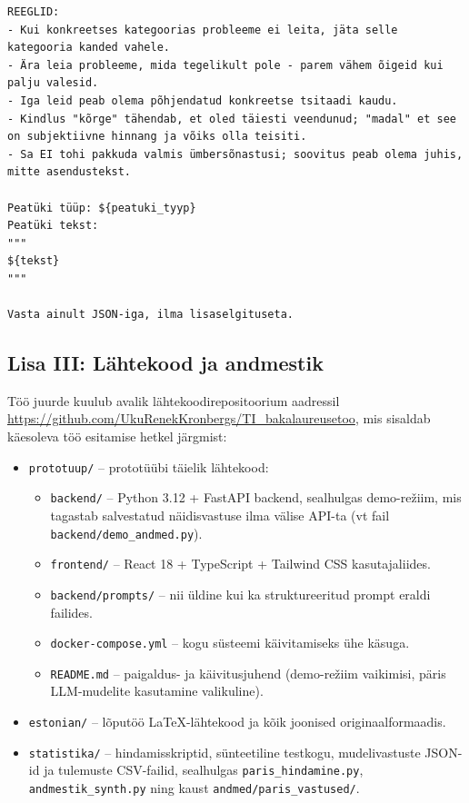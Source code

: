 \begin{verbatim}
REEGLID:
- Kui konkreetses kategoorias probleeme ei leita, jäta selle kategooria kanded vahele.
- Ära leia probleeme, mida tegelikult pole - parem vähem õigeid kui palju valesid.
- Iga leid peab olema põhjendatud konkreetse tsitaadi kaudu.
- Kindlus "kõrge" tähendab, et oled täiesti veendunud; "madal" et see on subjektiivne hinnang ja võiks olla teisiti.
- Sa EI tohi pakkuda valmis ümbersõnastusi; soovitus peab olema juhis, mitte asendustekst.

Peatüki tüüp: ${peatuki_tyyp}
Peatüki tekst:
"""
${tekst}
"""

Vasta ainult JSON-iga, ilma lisaselgituseta.
\end{verbatim}

\clearpage
\subsection*{Lisa III: Lähtekood ja andmestik} \label{lisa:arhiiv}

Töö juurde kuulub avalik lähtekoodirepositoorium aadressil \url{https://github.com/UkuRenekKronbergs/TI_bakalaureusetoo}, mis sisaldab käesoleva töö esitamise hetkel järgmist:

\begin{itemize}
    \item \texttt{prototuup/} -- prototüübi täielik lähtekood:
    \begin{itemize}
        \item \texttt{backend/} -- Python 3.12 + FastAPI backend, sealhulgas demo-režiim, mis tagastab salvestatud näidisvastuse ilma välise API-ta (vt fail \texttt{backend/demo\_andmed.py}).
        \item \texttt{frontend/} -- React 18 + TypeScript + Tailwind CSS kasutajaliides.
        \item \texttt{backend/prompts/} -- nii üldine kui ka struktureeritud prompt eraldi failides.
        \item \texttt{docker-compose.yml} -- kogu süsteemi käivitamiseks ühe käsuga.
        \item \texttt{README.md} -- paigaldus- ja käivitusjuhend (demo-režiim vaikimisi, päris LLM-mudelite kasutamine valikuline).
    \end{itemize}
    \item \texttt{estonian/} -- lõputöö \LaTeX-lähtekood ja kõik joonised originaalformaadis.
    \item \texttt{statistika/} -- hindamisskriptid, sünteetiline testkogu, mudelivastuste JSON-id ja tulemuste CSV-failid, sealhulgas \texttt{paris\_hindamine.py}, \texttt{andmestik\_synth.py} ning kaust \texttt{andmed/paris\_vastused/}.
\end{itemize}

